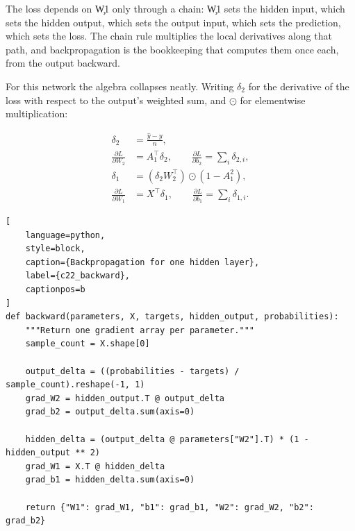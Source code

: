
The loss depends on \c{W1} only through a chain: \c{W1} sets the hidden input,
which sets the hidden output, which sets the output input, which sets the
prediction, which sets the loss. The chain rule multiplies the local derivatives
along that path, and backpropagation is the bookkeeping that computes them once
each, from the output backward.

For this network the algebra collapses neatly. Writing $\delta_2$ for the
derivative of the loss with respect to the output's weighted sum, and $\odot$
for elementwise multiplication:

\begin{align*}
\delta_2 &= \frac{\hat{y} - y}{n}, \\
\frac{\partial L}{\partial W_2} &= A_1^{\top}\delta_2, \qquad
\frac{\partial L}{\partial b_2} = \sum_i \delta_{2,i}, \\
\delta_1 &= \left(\delta_2 W_2^{\top}\right) \odot \left(1 - A_1^{2}\right), \\
\frac{\partial L}{\partial W_1} &= X^{\top}\delta_1, \qquad
\frac{\partial L}{\partial b_1} = \sum_i \delta_{1,i}.
\end{align*}

\begin{lstlisting}[
    language=python,
    style=block,
    caption={Backpropagation for one hidden layer},
    label={c22_backward},
    captionpos=b
]
def backward(parameters, X, targets, hidden_output, probabilities):
    """Return one gradient array per parameter."""
    sample_count = X.shape[0]

    output_delta = ((probabilities - targets) / sample_count).reshape(-1, 1)
    grad_W2 = hidden_output.T @ output_delta
    grad_b2 = output_delta.sum(axis=0)

    hidden_delta = (output_delta @ parameters["W2"].T) * (1 - hidden_output ** 2)
    grad_W1 = X.T @ hidden_delta
    grad_b1 = hidden_delta.sum(axis=0)

    return {"W1": grad_W1, "b1": grad_b1, "W2": grad_W2, "b2": grad_b2}
\end{lstlisting}

